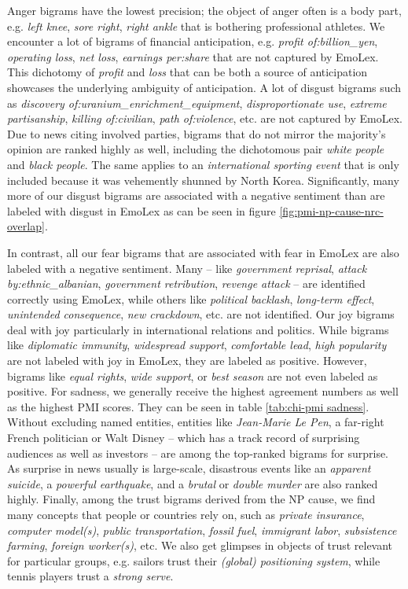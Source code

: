 Anger bigrams have the lowest precision; the object of anger often is a body part, e.g. \textit{left knee}, \textit{sore right}, \textit{right ankle} that is bothering professional athletes. We encounter a lot of bigrams of financial anticipation, e.g. \textit{profit of:billion\_yen}, \textit{operating loss}, \textit{net loss}, \textit{earnings per:share} that are not captured by EmoLex. This dichotomy of \textit{profit} and \textit{loss} that can be both a source of anticipation showcases the underlying ambiguity of anticipation.
A lot of disgust bigrams such as \textit{discovery of:uranium\_enrichment\_equipment}, \textit{disproportionate use}, \textit{extreme partisanship}, \textit{killing of:civilian}, \textit{path of:violence}, etc. are not captured by EmoLex. Due to news citing involved parties, bigrams that do not mirror the majority's opinion are ranked highly as well, including the dichotomous pair \textit{white people} and \textit{black people}. The same applies to an \textit{international sporting event} that is only included because it was vehemently shunned by North Korea. Significantly, many more of our disgust bigrams are associated with a negative sentiment than are labeled with disgust in EmoLex as can be seen in figure \ref{fig:pmi-np-cause-nrc-overlap}.

In contrast, all our fear bigrams that are associated with fear in EmoLex are also labeled with a negative sentiment. Many -- like \textit{government reprisal}, \textit{attack by:ethnic\_albanian}, \textit{government retribution}, \textit{revenge attack} -- are identified correctly using EmoLex, while others like \textit{political backlash}, \textit{long-term effect}, \textit{unintended consequence}, \textit{new crackdown}, etc. are not identified.
Our joy bigrams deal with joy particularly in international relations and politics. While bigrams like \textit{diplomatic immunity}, \textit{widespread support}, \textit{comfortable lead}, \textit{high popularity} are not labeled with joy in EmoLex, they are labeled as positive. However, bigrams like \textit{equal rights}, \textit{wide support}, or \textit{best season} are not even labeled as positive.
For sadness, we generally receive the highest agreement numbers as well as the highest PMI scores. They can be seen in table \ref{tab:chi-pmi sadness}.
Without excluding named entities, entities like \textit{Jean-Marie Le Pen}, a far-right French politician or Walt Disney -- which has a track record of surprising audiences as well as investors -- are among the top-ranked bigrams for surprise. As surprise in news usually is large-scale, disastrous events like an \textit{apparent suicide}, a \textit{powerful earthquake}, and a \textit{brutal} or \textit{double murder} are also ranked highly.
Finally, among the trust bigrams derived from the NP cause, we find many concepts that people or countries rely on, such as \textit{private insurance}, \textit{computer model(s)}, \textit{public transportation}, \textit{fossil fuel}, \textit{immigrant labor}, \textit{subsistence farming}, \textit{foreign worker(s)}, etc. We also get glimpses in objects of trust relevant for particular groups, e.g. sailors trust their \textit{(global) positioning system}, while tennis players trust a \textit{strong serve}.

